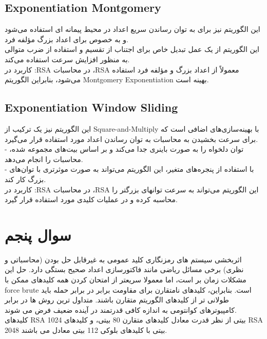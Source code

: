 \subsection{Exponentiation Montgomery}
این الگوریتم نیز برای به توان رساندن سریع اعداد در محیط پیمانه ای استفاده می‌شود و به خصوص برای اعداد بزرگ مؤلفه فرد.\\
 این الگوریتم از یک عمل تبدیل خاص برای اجتناب از تقسیم و استفاده از ضرب متوالی به منظور افزایش سرعت استفاده می‌کند.\\
کاربرد در :RSA در محاسبات ،RSA معمولاً از اعداد بزرگ و مؤلفه فرد استفاده می‌شود، بنابراین الگوریتم Montgomery Exponentiation بهینه است.
\subsection{Exponentiation Window Sliding}
این الگوریتم نیز یک ترکیب از Square-and-Multiply با بهینه‌سازی‌های اضافی است که برای سرعت بخشیدن به محاسبات به توان رساندن اعداد مورد استفاده قرار می‌گیرد.\\
   - توان دلخواه را به صورت باینری جدا می‌کند و بر اساس بیت‌های مجموعه شده، محاسبات را انجام می‌دهد.\\
     - با استفاده از پنجره‌های متغیر، این الگوریتم می‌تواند به صورت موثرتری با توان‌های بزرگ کار کند.\\
کاربرد در :RSA در محاسبات ،RSA این الگوریتم می‌تواند به سرعت توانهای بزرگتر را محاسبه کرده و در عملیات کلیدی مورد استفاده قرار گیرد.

\section{سوال پنجم}
اثربخشی سیستم های رمزنگاری کلید عمومی به غیرقابل حل بودن (محاسباتی و نظری) برخی مسائل ریاضی مانند فاکتورسازی اعداد صحیح بستگی دارد. حل این مشکلات زمان بر است، اما معمولا سریعتر از امتحان کردن همه کلیدهای ممکن با force brute است. بنابراین، کلیدهای نامتقارن برای مقاومت برابر در برابر حمله باید طولانی تر از کلیدهای الگوریتم متقارن باشند. متداول ترین روش ها در برابر کامپیوترهای کوانتومی به اندازه کافی قدرتمند در آینده ضعیف فرض می شوند.\\
کلیدهای RSA 1024 بیتی از نظر قدرت معادل کلیدهای متقارن 80 بیتی، و کلیدهای RSA 2048 بیتی با کلیدهای بلوکی 112 بیتی معادل می باشند.

